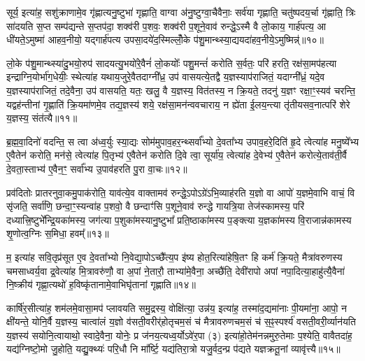 सूर्य॒ इत्या॑ह॒ सशु॑क्राणामे॒व गृ॑ह्णात्यनु॒ष्टुभा॑ गृह्णाति॒ वाग्वा अ॑नु॒ष्टुग्वा॒चैवैनाः॒ सर्व॑या गृह्णाति॒ चतु॑ष्पदय॒र्चा गृ॑ह्णाति॒ त्रिः सा॑दयति स॒प्त सम्प॑द्यन्ते स॒प्तप॑दा॒ शक्व॑री प॒शवः॒ शक्व॑री प॒शूने॒वाव॑ रुन्द्धे॒\-ऽस्मै वै लो॒काय॒ गार्\mbox{}ह॑पत्य॒ आ धी॑यते॒\-ऽमुष्मा॑ आहव॒नीयो॒ यद्गार्\mbox{}ह॑पत्य उपसा॒दये॑द॒स्मिल्लोँ॒के प॑शु॒मान्थ्स्या॒द्ययदा॑हव॒नीये॒\-ऽमुष्मिन्न्॑॥१०॥

लो॒के प॑शु॒मान्थ्स्या॑दु॒भयो॒रुप॑ सादयत्यु॒भयो॑रे॒वैनं॑ लो॒कयोः᳚ पशु॒मन्तं॑ करोति स॒र्वतः॒ परि॑ हरति॒ रक्ष॑सा॒मप॑हत्या इन्द्राग्नि॒योर्भा॑ग॒धेयीः॒ स्थेत्या॑ह यथाय॒जुरे॒वैतदाग्नी᳚ध्र॒ उप॑ वासयत्ये॒तद्वै य॒ज्ञस्याप॑राजितं॒ यदाग्नी᳚ध्रं॒ यदे॒व य॒ज्ञस्याप॑राजितं॒ तदे॒वैना॒ उप॑ वासयति॒ यतः॒ खलु॒ वै य॒ज्ञस्य॒ वित॑तस्य॒ न क्रि॒यते॒ तदनु॑ य॒ज्ञꣳ रक्षा॒ꣳ॒स्यव॑ चरन्ति॒ यद्वह॑न्तीनां गृ॒ह्णाति॑ क्रि॒यमा॑णमे॒व तद्य॒ज्ञस्य॑ शये॒ रक्ष॑सा॒मन॑न्ववचाराय॒ न ह्ये॑ता ई॒लय॒न्त्या तृ॑तीयसव॒नात्परि॑ शेरे य॒ज्ञस्य॒ संत॑त्यै॥११॥

{\anuvakamend[{स्या॒दिन्द्रो॑ गृह्णी॒याद॑स्त्व॒मुष्मि॑न्क्रि॒यते॒ षड्विꣳ॑शतिश्च॥२॥}]}

ब्र॒ह्म॒वा॒दिनो॑ वदन्ति॒ स त्वा अ॑ध्व॒र्युः स्या॒द्यः सोम॑मुपाव॒हर॒न्थ्सर्वा᳚भ्यो दे॒वता᳚भ्य उपाव॒हरे॒दिति॑ हृ॒दे त्वेत्या॑ह मनु॒ष्ये᳚भ्य ए॒वैतेन॑ करोति॒ मन॑से॒ त्वेत्या॑ह पि॒तृभ्य॑ ए॒वैतेन॑ करोति दि॒वे त्वा॒ सूर्या॑य॒ त्वेत्या॑ह दे॒वेभ्य॑ ए॒वैतेन॑ करोत्ये॒ताव॑ती॒र्वै दे॒वता॒स्ताभ्य॑ ए॒वैन॒ꣳ॒ सर्वा᳚भ्य उ॒पाव॑हरति पु॒रा वा॒चः॥१२॥

प्रव॑दितोः प्रातरनुवा॒कमु॒पाक॑रोति॒ याव॑त्ये॒व वाक्तामव॑ रुन्द्धे॒\-ऽपो\-ऽग्रे॑\-ऽभि॒व्याह॑रति य॒ज्ञो वा आपो॑ य॒ज्ञमे॒वाभि वाचं॒ वि सृ॑जति॒ सर्वा॑णि॒ छन्दा॒ꣳ॒स्यन्वा॑ह प॒शवो॒ वै छन्दाꣳ॑सि प॒शूने॒वाव॑ रुन्द्धे गायत्रि॒या तेज॑स्कामस्य॒ परि॑ दध्यात्त्रि॒ष्टुभे᳚न्द्रि॒यका॑मस्य॒ जग॑त्या प॒शुका॑मस्यानु॒ष्टुभा᳚ प्रति॒ष्ठाका॑मस्य प॒ङ्क्त्या य॒ज्ञका॑मस्य वि॒राजान्न॑कामस्य शृ॒णोत्व॒ग्निः स॒मिधा॒ हवम्᳚॥१३॥

म॒ इत्या॑ह सवि॒तृप्र॑सूत ए॒व दे॒वता᳚भ्यो नि॒वेद्या॒पो\-ऽच्छै᳚त्य॒प इ॑ष्य होत॒रित्या॑हेषि॒तꣳ हि कर्म॑ क्रि॒यते॒ मैत्रा॑वरुणस्य चमसाध्वर्य॒वा द्र॒वेत्या॑ह मि॒त्रावरु॑णौ॒ वा अ॒पां ने॒तारौ॒ ताभ्या॑मे॒वैना॒ अच्छै॑ति॒ देवी॑रापो अपां नपा॒दित्या॒हाहु॑त्यै॒वैना॑ नि॒ष्क्रीय॑ गृह्णा॒त्यथो॑ ह॒विष्कृ॑तानामे॒वाभिघृ॑तानां गृह्णाति॥१४॥

कार्\mbox{}षि॑र॒सीत्या॑ह॒ शम॑लमे॒वासा॒मप॑ प्लावयति समु॒द्रस्य॒ वोक्षि॑त्या॒ उन्न॑य॒ इत्या॑ह॒ तस्मा॑द॒द्यमा॑नाः पी॒यमा॑ना॒ आपो॒ न क्षी॑यन्ते॒ योनि॒र्वै य॒ज्ञस्य॒ चात्वा॑लं य॒ज्ञो व॑सती॒वरीर्\mbox{}॑होतृचम॒सं च॑ मैत्रावरुणचम॒सं च॑ स॒ꣴ॒स्पर्श्य॑ वसती॒वरी॒र्व्यान॑यति य॒ज्ञस्य॑ सयोनि॒त्वायाथो॒ स्वादे॒वैना॒ योनेः॒ प्र ज॑नय॒त्यध्व॒र्यो\-ऽवे॑र॒पा (३) इत्या॑हो॒तेम॑नन्नमुरु॒तेमाः प॒श्येति॒ वावैतदा॑ह॒ यद्य॑ग्निष्टो॒मो जु॒होति॒ यद्यु॒क्थ्यः॑ परि॒धौ नि मा᳚र्ष्टि॒ यद्य॑तिरा॒त्रो यजु॒र्वद॒न्प्र प॑द्यते यज्ञक्रतू॒नां व्यावृ॑त्त्यै॥१५॥

